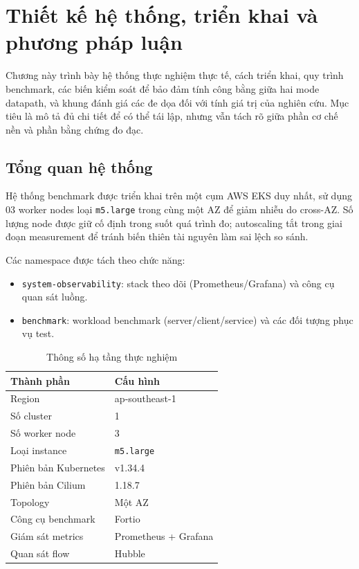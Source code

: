 
\chapter{Thiết kế hệ thống, triển khai và phương pháp luận}

Chương này trình bày hệ thống thực nghiệm thực tế, cách triển khai, quy trình benchmark, các biến kiểm soát để bảo đảm tính công bằng giữa hai mode datapath, và khung đánh giá các đe dọa đối với tính giá trị của nghiên cứu. Mục tiêu là mô tả đủ chi tiết để có thể tái lập, nhưng vẫn tách rõ giữa phần cơ chế nền và phần bằng chứng đo đạc.

\section{Tổng quan hệ thống}
\label{sec:system-overview}

Hệ thống benchmark được triển khai trên một cụm AWS EKS duy nhất, sử dụng 03 worker nodes loại \texttt{m5.large} trong cùng một AZ để giảm nhiễu do cross-AZ. Số lượng node được giữ cố định trong suốt quá trình đo; autoscaling tắt trong giai đoạn measurement để tránh biến thiên tài nguyên làm sai lệch so sánh.

Các namespace được tách theo chức năng:
\begin{itemize}
  \item \texttt{system-observability}: stack theo dõi (Prometheus/Grafana) và công cụ quan sát luồng.
  \item \texttt{benchmark}: workload benchmark (server/client/service) và các đối tượng phục vụ test.
\end{itemize}

\begin{table}[H]
\centering
\caption{Thông số hạ tầng thực nghiệm}
\label{tab:infrastructure-specs}
\begin{tabularx}{\textwidth}{>{\raggedright\arraybackslash}p{4cm}X}
\toprule
\textbf{Thành phần} & \textbf{Cấu hình} \\
\midrule
Region & ap-southeast-1 \\
Số cluster & 1 \\
Số worker node & 3 \\
Loại instance & \texttt{m5.large} \\
Phiên bản Kubernetes & v1.34.4 \\
Phiên bản Cilium & 1.18.7 \\
Topology & Một AZ \\
Công cụ benchmark & Fortio \\
Giám sát metrics & Prometheus + Grafana \\
Quan sát flow & Hubble \\
\bottomrule
\end{tabularx}
\end{table}

